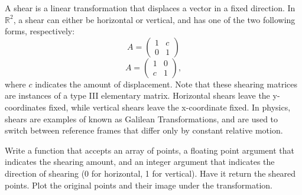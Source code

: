 A shear is a linear transformation that displaces a vector in a fixed direction.
In $\mathbb{R}^2$, a shear can either be horizontal or vertical, and has one of
the two following forms, respectively:
\[
A = \begin{pmatrix}
1 & c \\
0 & 1
\end{pmatrix}
\]
\[
A = \begin{pmatrix}
1 & 0 \\
c & 1
\end{pmatrix},
\]
where $c$ indicates the amount of displacement.  Note that
these shearing matrices are instances of a type III elementary matrix. Horizontal
shears leave the y-coordinates fixed, while vertical shears leave the x-coordinate
fixed. In physics, shears are examples of known as Galilean Transformations, and are used
to switch between reference frames that differ only by constant relative motion.

\begin{problem}
Write a function that accepts an array of points, a floating point argument that 
indicates the shearing amount, and an integer argument
that indicates the direction of shearing (0 for horizontal, 1 for vertical).
Have it return the sheared points.
Plot the original points and their image under the transformation.
\end{problem}

